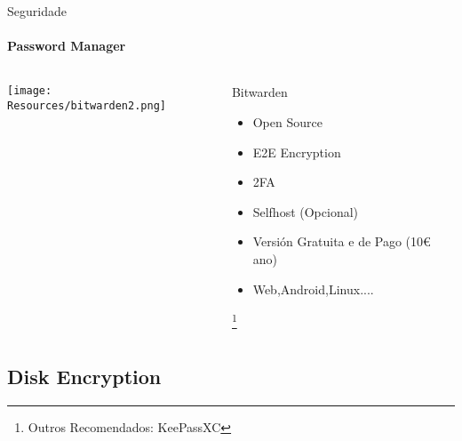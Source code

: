 \documentclass{beamer}
\begin{document}
\begin{frame}{Seguridade}
  \framesubtitle{Password Manager}

  \begin{columns}
    \begin{column}{0.6\textwidth}
      \hspace{30pt}\texttt{[image: Resources/bitwarden2.png]}

      \vspace{1cm}

      \hspace{30pt} %


    \end{column}

    \begin{column}{0.5\textwidth}
      \begin{block}{Bitwarden}
        \begin{itemize}
          \item Open Source
          \item E2E Encryption
          \item 2FA
          \item Selfhost (Opcional)
          \item Versión Gratuita e de Pago (10€ ano)
          \item Web,Android,Linux....
        \end{itemize}
      \end{block}

      \footnote{Outros Recomendados: KeePassXC}


    \end{column}

  \end{columns}

\end{frame}

\subsection{Disk Encryption}
\end{document}
